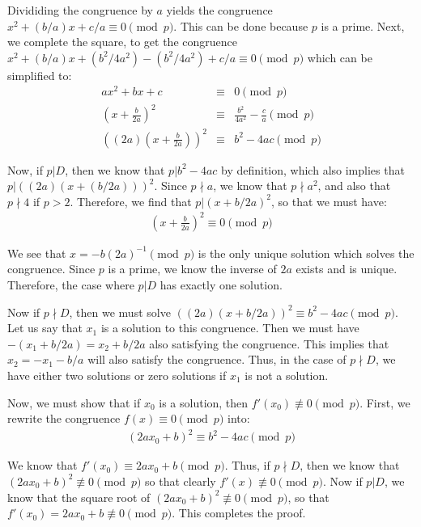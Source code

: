 \documentclass[psamsfonts]{amsart}
\newenvironment{sol}{{\bfseries Solution}}{\qedsymbol}
\theoremstyle{definition}
\theoremstyle{remark}
\numberwithin{equation}{section}
\begin{document}
\begin{sol}
Divididing the congruence by $a$ yields the congruence $ x^2 + (b/a) x + c/a \equiv 0 \pmod{p}$. This can be done because $p$ is a prime. Next, we complete the square, to get the congruence $x^2 + (b/a) x + (b^2/4a^2) - (b^2/4a^2) + c/a \equiv 0 \pmod{p} $ which can be simplified to:
\begin{eqnarray}
ax^2 + bx + c &\equiv& 0 \pmod{p} \\
\left(x + \frac{b}{2a} \right)^2 &\equiv& \frac{b^2}{4a^2} - \frac{c}{a} \pmod{p} \\
\left( (2a) \left( x + \frac{b}{2a} \right) \right)^2 &\equiv& b^2 - 4ac \pmod{p}
\end{eqnarray}

Now, if $p | D$, then we know that $p | b^2 - 4ac$ by definition, which also implies that $p | ((2a)(x + (b/2a)))^2$. Since $p \nmid a$, we know that $p \nmid a^2$, and also that $p \nmid 4$ if $p > 2$. Therefore, we find that $p | (x + b/2a)^2$, so that we must have:
\begin{eqnarray}
\left( x + \frac{b}{2a} \right)^2 \equiv 0 \pmod{p}
\end{eqnarray} 

We see that $x = - b (2a)^{-1} \pmod{p}$ is the only unique solution which solves the congruence. Since $p$ is a prime, we know the inverse of $2a$ exists and is unique. Therefore, the case where $p | D$ has exactly one solution.

Now if $p \nmid D$, then we must solve $((2a)(x + b/2a))^2 \equiv b^2 - 4ac \pmod{p}$. Let us say that $x_1$ is a solution to this congruence. Then we must have $-(x_1 + b/2a) = x_2 + b/2a$ also satisfying the congruence. This implies that $x_2 = - x_1 - b/a$ will also satisfy the congruence. Thus, in the case of $p \nmid D$, we have either two solutions or zero solutions if $x_1$ is not a solution.

Now, we must show that if $x_0$ is a solution, then $f'(x_0) \not \equiv 0 \pmod{p}$. First, we rewrite the congruence $f(x) \equiv 0 \pmod{p}$ into:
\begin{eqnarray}
\left(2ax_0 + b \right)^2 \equiv b^2 - 4ac \pmod {p}
\end{eqnarray}

We know that $f'(x_0) \equiv 2a x_0 + b \pmod{p}$. Thus, if $p \nmid D$, then we know that $(2ax_0 + b)^2 \not \equiv 0 \pmod{p}$ so that clearly $f'(x) \not \equiv 0 \pmod{p}$. Now if $p | D$, we know that the square root of $(2ax_0 + b)^2 \not \equiv 0 \pmod{p}$, so that $f'(x_0) = 2ax_0 + b \not \equiv 0 \pmod{p}$. This completes the proof.
\end{sol}
\end{document}
